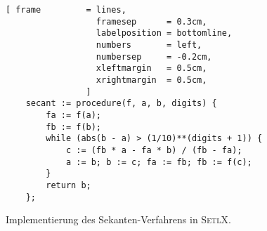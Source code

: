 \begin{figure}[!ht]
  \centering
\begin{Verbatim}[ frame         = lines, 
                  framesep      = 0.3cm, 
                  labelposition = bottomline,
                  numbers       = left,
                  numbersep     = -0.2cm,
                  xleftmargin   = 0.5cm,
                  xrightmargin  = 0.5cm,
                ]
    secant := procedure(f, a, b, digits) {
        fa := f(a); 
        fb := f(b); 
        while (abs(b - a) > (1/10)**(digits + 1)) {
            c := (fb * a - fa * b) / (fb - fa);
            a := b; b := c; fa := fb; fb := f(c); 
        }
        return b;
    };
\end{Verbatim}
\vspace*{-0.3cm}
  \caption{Implementierung des Sekanten-Verfahrens in \textsc{SetlX}.}
  \label{fig:secant.stlx}
\end{figure} %


\begin{table}[!h]
  \centering
{}
  \caption{L\"osung der Gleichung $x - \cos(x) = 0$ mit dem Sekanten-Verfahren.}
  \label{tab:secant-method}
\end{table}



